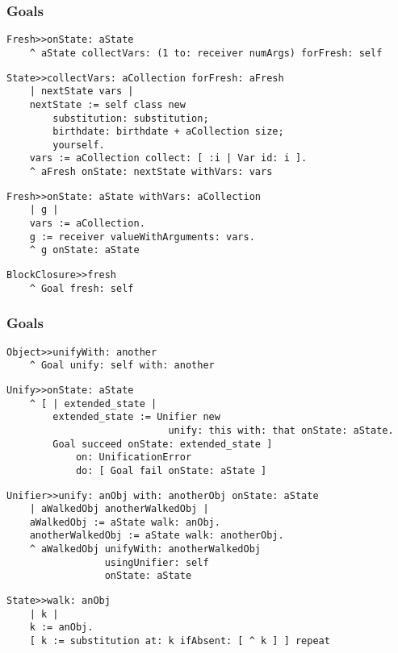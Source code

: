 \documentclass{beamer}
\begin{document}
\begin{frame}[fragile]
\frametitle{Goals}
\begin{verbatim}
Fresh>>onState: aState
    ^ aState collectVars: (1 to: receiver numArgs) forFresh: self
\end{verbatim}
\begin{verbatim}
State>>collectVars: aCollection forFresh: aFresh
    | nextState vars |
    nextState := self class new
        substitution: substitution;
        birthdate: birthdate + aCollection size;
        yourself.
    vars := aCollection collect: [ :i | Var id: i ].
    ^ aFresh onState: nextState withVars: vars
\end{verbatim}
\begin{verbatim}
Fresh>>onState: aState withVars: aCollection
    | g |
    vars := aCollection.
    g := receiver valueWithArguments: vars.
    ^ g onState: aState
\end{verbatim}
\begin{verbatim}
BlockClosure>>fresh
    ^ Goal fresh: self
\end{verbatim}
\end{frame}

\begin{frame}[fragile]
\frametitle{Goals}
\begin{verbatim}
Object>>unifyWith: another
    ^ Goal unify: self with: another
\end{verbatim}
\begin{verbatim}
Unify>>onState: aState
    ^ [ | extended_state |
        extended_state := Unifier new 
                            unify: this with: that onState: aState.
        Goal succeed onState: extended_state ]
            on: UnificationError
            do: [ Goal fail onState: aState ]
\end{verbatim}
\begin{verbatim}
Unifier>>unify: anObj with: anotherObj onState: aState
    | aWalkedObj anotherWalkedObj |
    aWalkedObj := aState walk: anObj.
    anotherWalkedObj := aState walk: anotherObj.
    ^ aWalkedObj unifyWith: anotherWalkedObj 
                 usingUnifier: self 
                 onState: aState
\end{verbatim}
\begin{verbatim}
State>>walk: anObj
    | k |
    k := anObj.
    [ k := substitution at: k ifAbsent: [ ^ k ] ] repeat
\end{verbatim}
\end{frame}
\end{document}
